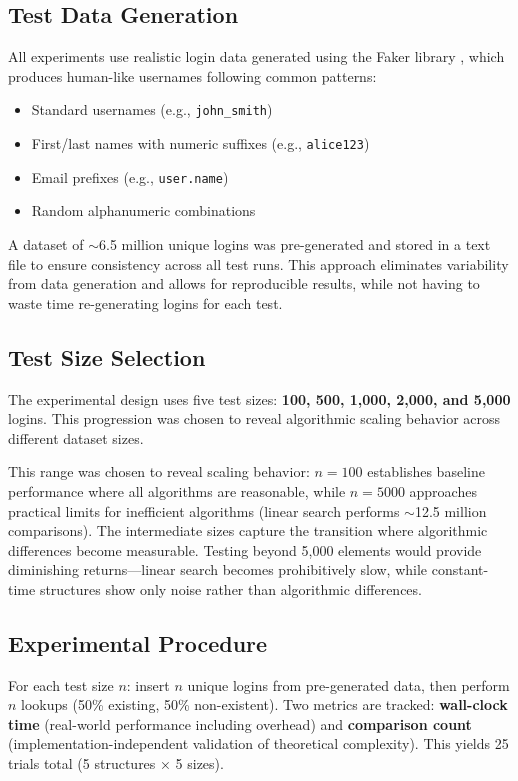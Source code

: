 \subsection{Test Data Generation}

All experiments use realistic login data generated using the Faker library \cite{faker2024}, which produces human-like usernames following common patterns:
\begin{itemize}
    \item Standard usernames (e.g., \texttt{john\_smith})
    \item First/last names with numeric suffixes (e.g., \texttt{alice123})
    \item Email prefixes (e.g., \texttt{user.name})
    \item Random alphanumeric combinations
\end{itemize}

A dataset of $\sim$6.5 million unique logins was pre-generated and stored in a text file to ensure consistency across all test runs. This approach eliminates variability from data generation and allows for reproducible results, while not having to waste time re-generating logins for each test.

\subsection{Test Size Selection}

The experimental design uses five test sizes: \textbf{100, 500, 1,000, 2,000, and 5,000} logins. This progression was chosen to reveal algorithmic scaling behavior across different dataset sizes.

This range was chosen to reveal scaling behavior: $n=100$ establishes baseline performance where all algorithms are reasonable, while $n=5000$ approaches practical limits for inefficient algorithms (linear search performs $\sim$12.5 million comparisons). The intermediate sizes capture the transition where algorithmic differences become measurable. Testing beyond 5,000 elements would provide diminishing returns---linear search becomes prohibitively slow, while constant-time structures show only noise rather than algorithmic differences.

\subsection{Experimental Procedure}

For each test size $n$: insert $n$ unique logins from pre-generated data, then perform $n$ lookups (50\% existing, 50\% non-existent). Two metrics are tracked: \textbf{wall-clock time} (real-world performance including overhead) and \textbf{comparison count} (implementation-independent validation of theoretical complexity). This yields 25 trials total (5 structures × 5 sizes).

